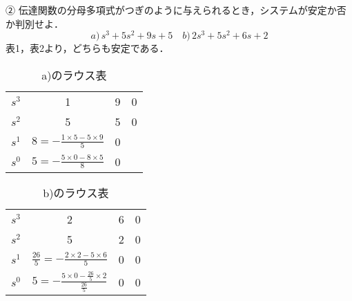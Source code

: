 ② 伝達関数の分母多項式がつぎのように与えられるとき，システムが安定か否か判別せよ．
$$
a)\,s^3+5s^2+9s+5\quad
b)\,2s^3+5s^2+6s+2
$$
表1，表2より，どちらも安定である．

\begin{table}[H]
    \centering
    \begin{tabular}{c|ccc}
        \hline
        $s^3$ & 1 & 9 & 0 \\
        $s^2$ & 5 & 5 & 0 \\
        $s^1$ & $8=-\frac{1\times 5-5\times 9}{5}$ & 0 &  \\
        $s^0$ & $5=-\frac{5\times 0-8\times 5}{8}$ & 0 &  \\ \hline
        
    \end{tabular}
    \caption{a)のラウス表}
\end{table}

\begin{table}[H]
    \centering
    \begin{tabular}{c|ccc}
        \hline
        $s^3$ & 2 & 6 & 0 \\
        $s^2$ & 5 & 2 & 0 \\
        $s^1$ & $\frac{26}{5}=-\frac{2\times 2-5\times 6}{5}$ & 0 & 0 \\
        $s^0$ & $5=-\frac{5\times 0-\frac{26}{5}\times 2}{\frac{26}{5}}$ & 0 & 0 \\ \hline
        
    \end{tabular}
    \caption{b)のラウス表}
\end{table}